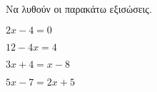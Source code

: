 Να λυθούν οι παρακάτω εξισώσεις.
\begin{multicols}{2}
\begin{alist}
\item $ 2x-4=0 $
\item $ 12-4x=4 $
\item $ 3x+4=x-8 $
\item $ 5x-7=2x+5 $
\end{alist}
\end{multicols}
